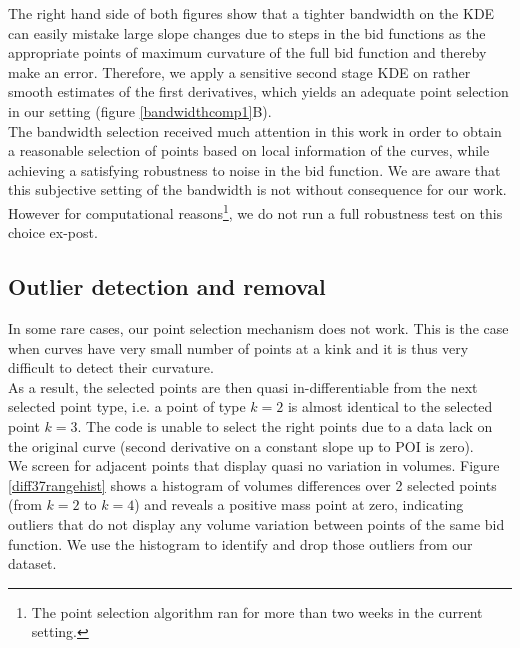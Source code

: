 \begin{subappendices}
The right hand side of both figures show that a tighter bandwidth on the KDE can easily mistake large slope changes due to steps in the bid functions as the appropriate points of maximum curvature of the full bid function and thereby make an error. Therefore, we apply a sensitive second stage KDE on rather smooth estimates of the first derivatives, which yields an adequate point selection in our setting (figure \ref{bandwidthcomp1}B). \\

The bandwidth selection received much attention in this work in order to obtain a reasonable selection of points based on local information of the curves, while achieving a satisfying robustness to noise in the bid function. We are aware that this subjective setting of the bandwidth is not without consequence for our work. However for computational reasons\footnote{The point selection algorithm ran for more than two weeks in the current setting.}, we do not run a full robustness test on this choice ex-post.

\subsection{Outlier detection and removal}
\label{outlier}
In some rare cases, our point selection mechanism does not work. This is the case when curves have very small number of points at a kink and it is thus very difficult to detect their curvature. \\

As a result, the selected points are then quasi in-differentiable from the next selected point type, i.e. a point of type $k=2$ is almost identical to the selected point $k=3$. The code is unable to select the right points due to a data lack on the original curve (second derivative on a constant slope up to POI is zero).\\

We screen for adjacent points that display quasi no variation in volumes. Figure \ref{diff37rangehist} shows a histogram of volumes differences over 2 selected points (from $k=2$ to $k=4$) and reveals a positive mass point at zero, indicating outliers that do not display any volume variation between points of the same bid function. We use the histogram to identify and drop those outliers from our dataset. 


\end{subappendices}
